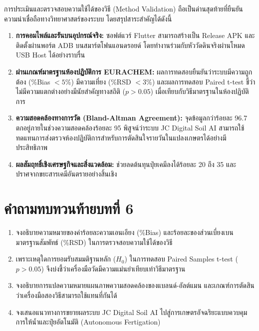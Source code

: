 การประเมินและตรวจสอบความใช้ได้ของวิธี (Method Validation) ถือเป็นด่านสุดท้ายที่ยืนยันความน่าเชื่อถือทางวิทยาศาสตร์ของระบบ โดยสรุปสาระสำคัญได้ดังนี้
\begin{enumerate}
    \item \textbf{การคอมไพล์และรันบนอุปกรณ์จริง:} ซอฟต์แวร์ Flutter สามารถสร้างเป็น Release APK และติดตั้งผ่านพอร์ต ADB บนสมาร์ตโฟนแอนดรอยด์ โดยทำงานร่วมกับหัววัดดินจริงผ่านโหมด USB Host ได้อย่างราบรื่น
    \item \textbf{ผ่านเกณฑ์มาตรฐานห้องปฏิบัติการ EURACHEM:} ผลการทดสอบยืนยันว่าระบบมีความถูกต้อง (\%Bias $< 5\%$) มีความเที่ยง (\%RSD $< 3\%$) และผลการทดสอบ Paired t-test ชี้ว่าไม่มีความแตกต่างอย่างมีนัยสำคัญทางสถิติ ($p > 0.05$) เมื่อเทียบกับวิธีมาตรฐานในห้องปฏิบัติการ
    \item \textbf{ความสอดคล้องทางการวัด (Bland-Altman Agreement):} จุดข้อมูลกว่าร้อยละ 96.7 ตกอยู่ภายในช่วงความสอดคล้องร้อยละ 95 พิสูจน์ว่าระบบ JC Digital Soil AI สามารถใช้ทดแทนการส่งตรวจห้องปฏิบัติการสำหรับการตัดสินใจรายวันในแปลงเกษตรได้อย่างมีประสิทธิภาพ
    \item \textbf{ผลสัมฤทธิ์เชิงเศรษฐกิจและสิ่งแวดล้อม:} ช่วยลดต้นทุนปุ๋ยเคมีลงได้ร้อยละ 20 ถึง 35 และปราศจากขยะสารเคมีอันตรายอย่างสิ้นเชิง
\end{enumerate}

\section*{คำถามทบทวนท้ายบทที่ 6}

\begin{enumerate}
    \item จงอธิบายความหมายของค่าร้อยละความเอนเอียง (\%Bias) และร้อยละของส่วนเบี่ยงเบนมาตรฐานสัมพัทธ์ (\%RSD) ในการตรวจสอบความใช้ได้ของวิธี
    \item เพราะเหตุใดการยอมรับสมมติฐานหลัก ($H_0$) ในการทดสอบ Paired Samples t-test ($p > 0.05$) จึงบ่งชี้ว่าเครื่องมือวัดมีความแม่นยำเทียบเท่าวิธีมาตรฐาน
    \item จงอธิบายการแปลความหมายแผนภาพความสอดคล้องของแบลนด์-อัลต์แมน และเกณฑ์การตัดสินว่าเครื่องมือสองวิธีสามารถใช้แทนที่กันได้
    \item จงเสนอแนวทางการขยายผลระบบ JC Digital Soil AI ไปสู่การเกษตรอัจฉริยะแบบควบคุมการให้น้ำและปุ๋ยอัตโนมัติ (Autonomous Fertigation)
\end{enumerate}
